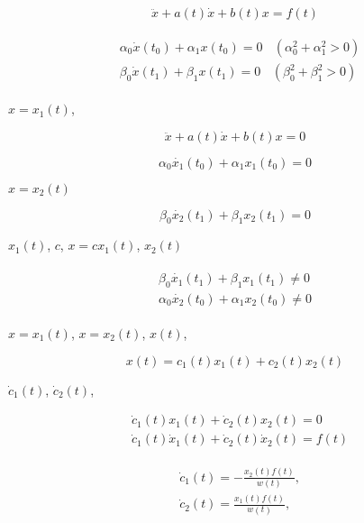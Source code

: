 \documentclass{article}
\theoremstyle{plain} \newtheorem*{theorem*}{Теорема}
\theoremstyle{plain} \newtheorem{theorem}{Теорема}[section]
\theoremstyle{definition} \newtheorem*{corollary*}{Следствие}
\theoremstyle{definition} \newtheorem{corollary}{Следствие}[section]
\theoremstyle{remark} \newtheorem*{example*}{Пример}
\begin{document}
\begin{equation}
    \ddot{x} + a(t)\dot{x} + b(t)x = f(t)
\end{equation}

\begin{gather}
\begin{split}
    & \alpha_0 \dot{x}(t_0) + \alpha_1 x(t_0) = 0
    \ \ \ \ (\alpha^2_0 + \alpha^2_1 > 0) \\
    & \beta_0 \dot{x}(t_1) + \beta_1 x(t_1) = 0
    \ \ \ \ (\beta^2_0 + \beta^2_1 > 0)
\end{split}
\end{gather}

$x = x_1(t)$,

\begin{equation}
    \ddot{x} + a(t) \dot{x} + b(t)x = 0
\end{equation}

\begin{equation*}
    \alpha_0 \dot{x_1}(t_0) + \alpha_1 x_1(t_0) = 0
\end{equation*}

$x = x_2(t)$

\begin{equation*}
    \beta_0 \dot{x_2}(t_1) + \beta_1 x_2(t_1) = 0
\end{equation*}

$x_1(t)$,
$c$,
$x = cx_1(t)$,
$x_2(t)$

\begin{gather}
    \begin{split}
    \beta_0 \dot{x_1}(t_1) + \beta_1 x_1(t_1) \ne 0 \\
    \alpha_0 \dot{x_2}(t_0) + \alpha_1 x_2(t_0) \ne 0
    \end{split}
\end{gather}

$x = x_1(t)$,
$x = x_2(t)$,
$x(t)$,

\begin{equation}
    x(t) = c_1(t) x_1(t) + c_2(t) x_2(t)
\end{equation}

$\dot{c}_1(t)$,
$\dot{c}_2(t)$,

\begin{align*}
    & \dot{c}_1(t) x_1(t) + \dot{c}_2(t) x_2(t) = 0 \\
    & \dot{c}_1(t) \dot{x}_1(t) + \dot{c}_2(t) \dot{x}_2(t) = f(t)
\end{align*}

\begin{gather}
    \begin{split}
        & \dot{c}_1(t) = - \frac{x_2(t)f(t)}{w(t)}, \\
        & \dot{c}_2(t) = \frac{x_1(t)f(t)}{w(t)},
    \end{split}
\end{gather}
\end{document}
